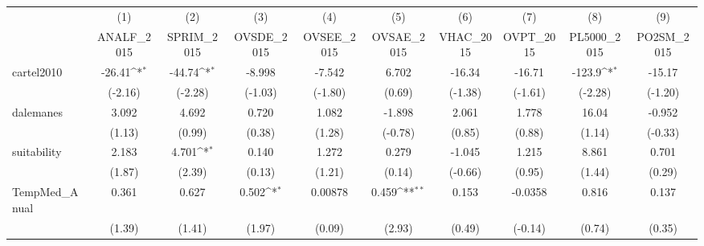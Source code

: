 {
\def\sym#1{\ifmmode^{#1}\else\(^{#1}\)\fi}
\begin{tabular}{l*{9}{c}}
\hline\hline
            &\multicolumn{1}{c}{(1)}&\multicolumn{1}{c}{(2)}&\multicolumn{1}{c}{(3)}&\multicolumn{1}{c}{(4)}&\multicolumn{1}{c}{(5)}&\multicolumn{1}{c}{(6)}&\multicolumn{1}{c}{(7)}&\multicolumn{1}{c}{(8)}&\multicolumn{1}{c}{(9)}\\
            &\multicolumn{1}{c}{ANALF\_2015}&\multicolumn{1}{c}{SPRIM\_2015}&\multicolumn{1}{c}{OVSDE\_2015}&\multicolumn{1}{c}{OVSEE\_2015}&\multicolumn{1}{c}{OVSAE\_2015}&\multicolumn{1}{c}{VHAC\_2015}&\multicolumn{1}{c}{OVPT\_2015}&\multicolumn{1}{c}{PL5000\_2015}&\multicolumn{1}{c}{PO2SM\_2015}\\
\hline
cartel2010  &      -26.41\sym{*}  &      -44.74\sym{*}  &      -8.998         &      -7.542         &       6.702         &      -16.34         &      -16.71         &      -123.9\sym{*}  &      -15.17         \\
            &     (-2.16)         &     (-2.28)         &     (-1.03)         &     (-1.80)         &      (0.69)         &     (-1.38)         &     (-1.61)         &     (-2.28)         &     (-1.20)         \\
[1em]
dalemanes   &       3.092         &       4.692         &       0.720         &       1.082         &      -1.898         &       2.061         &       1.778         &       16.04         &      -0.952         \\
            &      (1.13)         &      (0.99)         &      (0.38)         &      (1.28)         &     (-0.78)         &      (0.85)         &      (0.88)         &      (1.14)         &     (-0.33)         \\
[1em]
suitability &       2.183         &       4.701\sym{*}  &       0.140         &       1.272         &       0.279         &      -1.045         &       1.215         &       8.861         &       0.701         \\
            &      (1.87)         &      (2.39)         &      (0.13)         &      (1.21)         &      (0.14)         &     (-0.66)         &      (0.95)         &      (1.44)         &      (0.29)         \\
[1em]
TempMed\_Anual&       0.361         &       0.627         &       0.502\sym{*}  &     0.00878         &       0.459\sym{**} &       0.153         &     -0.0358         &       0.816         &       0.137         \\
            &      (1.39)         &      (1.41)         &      (1.97)         &      (0.09)         &      (2.93)         &      (0.49)         &     (-0.14)         &      (0.74)         &      (0.35)         \\

\end{tabular}}
